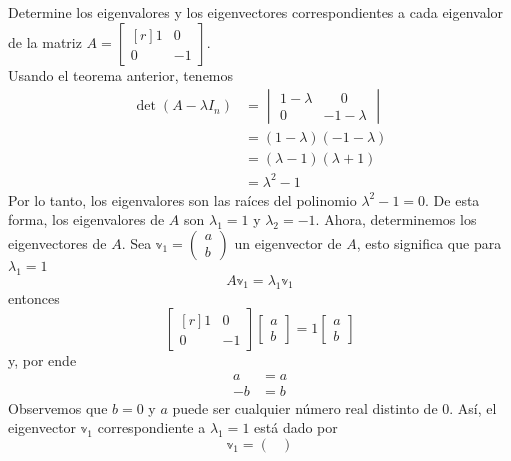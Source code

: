 \begin{example}\label{example_primero_eigenvalores}
    Determine los eigenvalores y los eigenvectores correspondientes a cada eigenvalor de la matriz $A = \begin{bmatrix*}[r]
        1 & 0 \\
        0 & -1
    \end{bmatrix*}$. \\
    \solucion Usando el teorema anterior, tenemos
    \begin{align*}
        \det(A - \lambda I_n) & = \begin{vmatrix}
            1 - \lambda & \phantom{-} 0 \\
            0 & -1 - \lambda
        \end{vmatrix} \\
        & = (1 - \lambda)(-1 - \lambda) \\
        & = (\lambda - 1)(\lambda + 1) \\
        & = \lambda^2 - 1
    \end{align*}
    Por lo tanto, los eigenvalores son las raíces del polinomio $\lambda^2 - 1 = 0$. De esta forma, los eigenvalores de $A$ son $\lambda_1 = 1$ y $\lambda_2 = -1$. Ahora, determinemos los eigenvectores de $A$. Sea $\mathbb{v}_1 = \begin{pmatrix} a \\ b \end{pmatrix}$ un eigenvector de $A$, esto significa que para $\lambda_1 = 1$
    $$A \mathbb{v}_1 = \lambda_1 \mathbb{v}_1$$
    entonces
    $$\begin{bmatrix*}[r]
        1 & 0 \\
        0 & -1
    \end{bmatrix*} \begin{bmatrix}
        a \\
        b
    \end{bmatrix} = 1 \begin{bmatrix}
        a \\
        b
    \end{bmatrix}$$
    y, por ende
    \begin{align*}
        a & = a \\
        - b & = b
    \end{align*}\newpage\noindent
    Observemos que $b = 0$ y $a$ puede ser cualquier número real distinto de $0$. Así, el eigenvector $\mathbb{v}_1$ correspondiente a $\lambda_1 = 1$ está dado por
    $$\mathbb{v}_1 = \begin{pmatrix}

\end{pmatrix}$$
\end{example}

